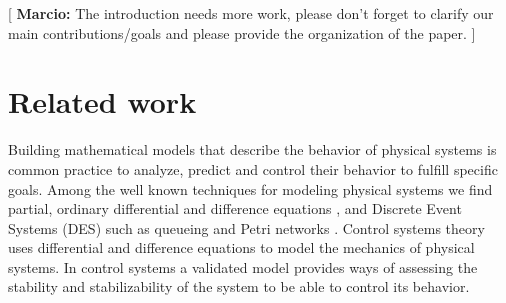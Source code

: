 \documentclass{aamas2016}
\newcommand{\note}[3]{{\color{#2} [ \ding{42} \textbf{#1:} {\small #3} ]}}
\newcommand{\comMarcio}[1]{\note{Marcio}{red}{#1}}
\begin{document}
\comMarcio{The introduction needs more work, please don't forget to clarify our main contributions/goals and please 
provide the organization of the paper.}







\section{Related work}

Building mathematical models that describe the behavior of physical systems is common practice to analyze, predict and 
control their behavior to fulfill specific goals. Among the well known techniques for modeling physical systems we find partial, ordinary
differential and difference equations \cite{Khalil-2002,Nise-2010}, and Discrete Event Systems (DES) such as queueing and Petri networks 
\cite{Cassandras-2008,Luna-2015,Urgaonkar-2007}.
Control systems theory uses differential and difference equations to model the mechanics of physical systems. In control systems
a validated model provides ways of assessing the stability and stabilizability of the system to be able to control its behavior.
\end{document}
